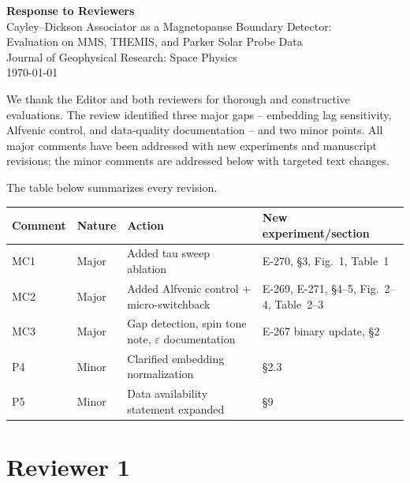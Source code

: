 \documentclass{article}
\begin{document}

\begin{center}
{\Large\bfseries Response to Reviewers}\\[0.8em]
{\large Cayley--Dickson Associator as a Magnetopause Boundary Detector:\\
Evaluation on MMS, THEMIS, and Parker Solar Probe Data}\\[0.5em]
Journal of Geophysical Research: Space Physics\\[0.5em]
{\today}
\end{center}

\bigskip

We thank the Editor and both reviewers for thorough and constructive
evaluations.  The review identified three major gaps -- embedding lag
sensitivity, Alfvenic control, and data-quality documentation -- and two
minor points.  All major comments have been addressed with new experiments
and manuscript revisions; the minor comments are addressed below with
targeted text changes.

The table below summarizes every revision.

\begin{table}[h]
\centering
\small
\begin{tabular}{llll}
\toprule
Comment & Nature & Action & New experiment/section \\
\midrule
MC1 & Major & Added tau sweep ablation & E-270, \S3, Fig.~1, Table~1 \\
MC2 & Major & Added Alfvenic control + micro-switchback & E-269, E-271, \S4--5, Fig.~2--4, Table~2--3 \\
MC3 & Major & Gap detection, spin tone note, $\varepsilon$ documentation & E-267 binary update, \S2 \\
P4 & Minor & Clarified embedding normalization & \S2.3 \\
P5 & Minor & Data availability statement expanded & \S9 \\
\bottomrule
\end{tabular}
\end{table}

\clearpage

\section*{Reviewer 1}
\end{document}
